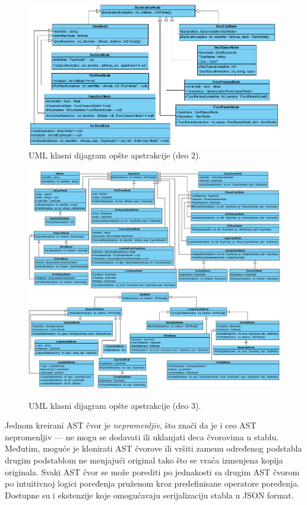 \begin{figure}[h!]
\centering
\includegraphics[scale=0.7]{images/uml/DeclarationNode.png}
\caption{UML klasni dijagram opšte apstrakcije (deo 2).}
\label{fig:UMLASTNode2}
\end{figure}

\begin{figure}[h!]
\centering
\includegraphics[scale=0.55]{images/uml/ExpressionNode.png}
\includegraphics[scale=0.55]{images/uml/StatementNode.png}
\caption{UML klasni dijagram opšte apstrakcije (deo 3).}
\label{fig:UMLASTNode3}
\end{figure}

Jednom kreirani AST čvor je \emph{nepromenljiv}, što znači da je i ceo AST nepromenljiv --- ne mogu se dodavati ili uklanjati deca čvorovima u stablu. Međutim, moguće je klonirati AST čvorove ili vršiti zamenu određenog podstabla drugim podstablom ne menjajući original tako što se vraća izmenjena kopija originala. Svaki AST čvor se može porediti po jednakosti sa drugim AST čvorom po intuitivnoj logici poređenja pruženom kroz predefinisane operatore poređenja. Dostupne su i ekstenzije koje omogućavaju serijalizaciju stabla u JSON format.

